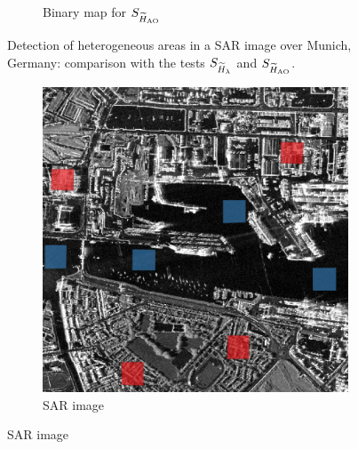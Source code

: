 \documentclass[
  lettersize  journal,
]{IEEEtran}%
\providecommand{\DIFaddbeginFL}{} %
\providecommand{\DIFaddendFL}{} %
\providecommand{\DIFdelbeginFL}{} %
\providecommand{\DIFdelendFL}{} %
\newcommand{\DIFscaledelfig}{0.5}
\newlength{\DIFdelgraphicswidth} %
\newlength{\DIFdelgraphicsheight} %
\newcommand{\DIFaddincludegraphics}[2][]{{\color{blue}\fbox{\DIFOincludegraphics[#1]{#2}}}} %
\newcommand{\DIFdelincludegraphics}[2][]{%
\sbox{\DIFdelgraphicsbox}{\DIFOincludegraphics[#1]{#2}}%
\settoboxwidth{\DIFdelgraphicswidth}{\DIFdelgraphicsbox} %
\settoboxtotalheight{\DIFdelgraphicsheight}{\DIFdelgraphicsbox} %
\scalebox{\DIFscaledelfig}{%
\parbox[b]{\DIFdelgraphicswidth}{\usebox{\DIFdelgraphicsbox}\\[-\baselineskip] \rule{\DIFdelgraphicswidth}{0em}}\llap{\resizebox{\DIFdelgraphicswidth}{\DIFdelgraphicsheight}{%
\setlength{\unitlength}{\DIFdelgraphicswidth}%
\begin{picture}(1,1)%
\thicklines\linethickness{2pt} %
{\color[rgb]{1,0,0}\put(0,0){\framebox(1,1){}}}%
{\color[rgb]{1,0,0}\put(0,0){\line( 1,1){1}}}%
{\color[rgb]{1,0,0}\put(0,1){\line(1,-1){1}}}%
\end{picture}%
}\hspace*{3pt}}} %
} %
\DeclareRobustCommand{\DIFaddbeginFL}{\DIFOaddbeginFL \let\includegraphics\DIFaddincludegraphics} %
\DeclareRobustCommand{\DIFaddendFL}{\DIFOaddendFL \let\includegraphics\DIFOincludegraphics} %
\DeclareRobustCommand{\DIFdelbeginFL}{\DIFOdelbeginFL \let\includegraphics\DIFdelincludegraphics} %
\DeclareRobustCommand{\DIFdelendFL}{\DIFOaddendFL \let\includegraphics\DIFOincludegraphics} %
\begin{document}
\begin{figure}[hbt]
\begin{subfigure}{0.144\textwidth}
        \DIFaddendFL \caption{Binary map for $\small{S_{\widetilde{H}_{\text{AO}}}}$}
        \DIFdelbeginFL %
\DIFdelendFL \DIFaddbeginFL \label{fig:munich-005-shann}
    \DIFaddendFL \end{subfigure}
    \caption{Detection of heterogeneous areas in a SAR image over Munich, Germany: comparison with the tests $\small{S_{\widetilde{H}_{\lambda}}}$ and $\small{S_{\widetilde{H}_{\text{AO}}}}$.}
    \label{fig:munich}
\end{figure}

\begin{figure}[hbt]
    \centering
        \DIFdelbeginFL %
\DIFdelendFL \DIFaddbeginFL \begin{subfigure}{0.145\textwidth}
        \includegraphics[width=\linewidth]{./Figures-R1/dublin_roi3.png}
        \DIFaddendFL \caption{SAR image}
        \DIFdelbeginFL %
\DIFdelendFL \DIFaddbeginFL \label{fig:dublin-sar}
    \DIFaddendFL \end{subfigure}
    \DIFdelbeginFL %

\end{figure}
\end{document}
